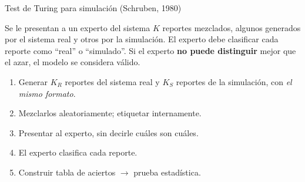 \documentclass[aspectratio=1610, 10pt]{beamer}
\begin{document}
\begin{frame}{Test de Turing para simulación (Schruben, 1980)}
  \begin{definicionbox}
    \footnotesize
    Se le presentan a un experto del sistema $K$ reportes mezclados, algunos
    generados por el sistema real y otros por la simulación. El experto debe
    clasificar cada reporte como ``real'' o ``simulado''. Si el experto
    \textbf{no puede distinguir} mejor que el azar, el modelo se considera válido.
  \end{definicionbox}

  \vspace{4pt}
  \begin{metodobox}
    \footnotesize
    \begin{enumerate}\itemsep1pt
      \item Generar $K_R$ reportes del sistema real y $K_S$ reportes de la
        simulación, con \emph{el mismo formato}.
      \item Mezclarlos aleatoriamente; etiquetar internamente.
      \item Presentar al experto, sin decirle cuáles son cuáles.
      \item El experto clasifica cada reporte.
      \item Construir tabla de aciertos $\to$ prueba estadística.
    \end{enumerate}
  \end{metodobox}
\end{frame}
\end{document}
